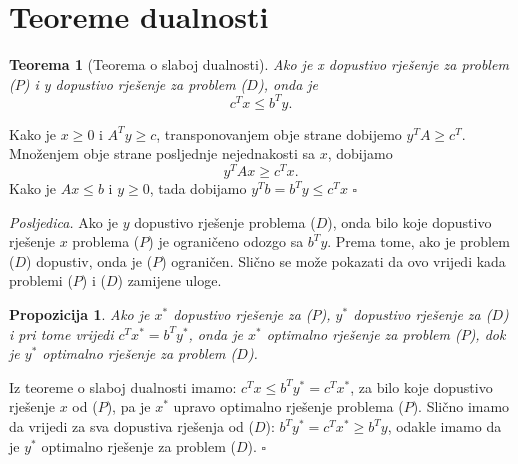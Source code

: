 \documentclass[a4paper, utf8, 11pt, colorlinks]{book}
\newtheorem{thm}{Teorema}
\newtheorem{prop}{Propozicija}
\newenvironment{proof}{{Dokaz:}}{\hfill$\square$}
\begin{document}
\section{Teoreme dualnosti}

\begin{thm}[Teorema o slaboj dualnosti]
  Ako je x dopustivo rješenje za problem ($P$) i y dopustivo rješenje za problem  ($D$), onda je 
  $$ c^T x \leq b^T y.$$
\end{thm}
\begin{proof}
         Kako je $x \geq 0$ i $A^T y \geq c $,  transponovanjem obje strane dobijemo 
         $y^T A \geq c^T$. Množenjem obje strane posljednje nejednakosti sa $x$, dobijamo 
         $$y^TAx \geq c^T x.$$ Kako je $Ax \leq b$ i $y \geq 0$,  tada dobijamo 
         $ y^T b = b^T y  \leq c^T x$
\end{proof}

\emph{Posljedica.} Ako je $y$ dopustivo rješenje problema  ($D$),  onda bilo koje dopustivo rješenje $x$ problema ($P$) je ograničeno odozgo sa $b^T y$. Prema tome, ako je problem ($D$) dopustiv, onda je ($P$) ograničen. Slično se može pokazati da ovo vrijedi kada problemi ($P$) i ($D$) zamijene uloge.

\begin{prop}  
    Ako je $x^*$ dopustivo rješenje za  ($P$), $y^*$ dopustivo rješenje za ($D$) i pri tome vrijedi 
    $c^T x^* = b^T y^*$, onda je $x^*$ optimalno rješenje za problem  ($P$), dok je $y^*$ optimalno rješenje za problem  ($D$).  
\end{prop}
\begin{proof}
         Iz teoreme o slaboj dualnosti imamo: $c^T x  \leq b^T y^* = c^T x^*$, za bilo koje dopustivo rješenje $x$ od  ($P$), pa je $x^*$ upravo optimalno rješenje problema  ($P$).
         Slično imamo da vrijedi za sva dopustiva rješenja od  ($D$): $b^T y^* = c^T x^* \geq b^T y$, odakle imamo da je $y^*$ optimalno rješenje za problem  ($D$). 
\end{proof}
\end{document}

